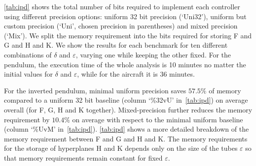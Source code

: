 \autoref{tab:ipd} shows the total number of bits required to implement each
controller using different precision options: uniform 32 bit precision
(`Uni32'), uniform but custom precision (`Uni', chosen precision in parentheses)
and mixed precision (`Mix'). We split the memory requirement into the bits
required for storing F and G and H and K. We show the results for each benchmark
for ten different combinations of $\delta$ and $\varepsilon$, varying one while
keeping the other fixed.
For the pendulum, the execution time of the whole analysis is 10 minutes no matter the
initial values for $\delta$ and $\varepsilon$, while for the aircraft it is 36
minutes. 



For the inverted pendulum, minimal uniform precision saves $57.5\%$ of memory
compared to a uniform 32 bit baseline (column `\%32vU' in~\autoref{tab:ipd}) on
average overall (for F, G, H and K together). Mixed-precision further reduces the memory
requirement by $10.4\%$ on average with respect to the minimal uniform baseline
(column `\%UvM' in~\autoref{tab:ipd}). 
\autoref{tab:ipd} shows a more detailed breakdown of the memory requirement
between F and G and H and K. The memory requirements for the storage of
hyperplanes H and K depends only on the size of the tubes $\varepsilon$ so that
memory requirements remain constant for fixed $\varepsilon$.

